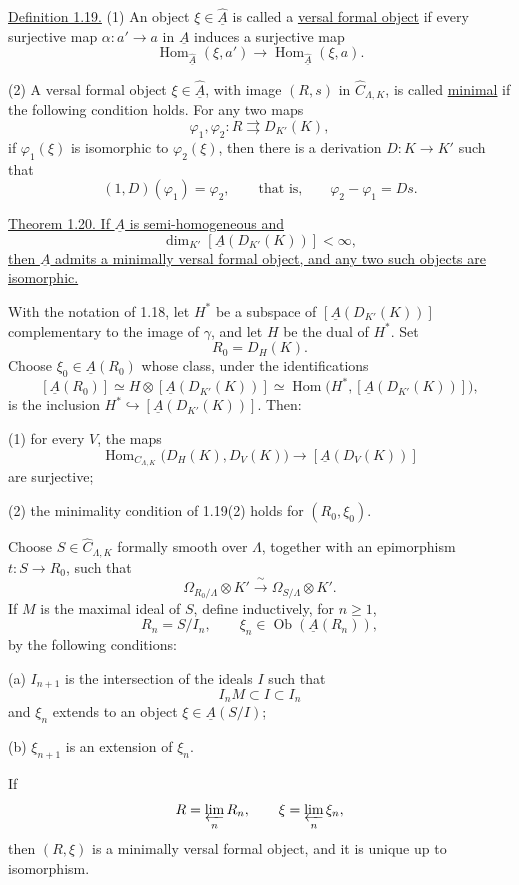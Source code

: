 
\underline{Definition 1.19.} (1) An object
$\xi\in\widehat{\underline A}$ is called a \underline{versal formal
object} if every surjective map $\alpha:a'\longrightarrow a$ in
$\underline A$ induces a surjective map
\[
 \operatorname{Hom}_{\widehat{\underline A}}(\xi,a')
 \longrightarrow
 \operatorname{Hom}_{\widehat{\underline A}}(\xi,a).
\]

(2) A versal formal object $\xi\in\widehat{\underline A}$, with
image $(R,s)$ in $\widehat C_{\Lambda,K}$, is called
\underline{minimal} if the following condition holds. For any two
maps
\[
 \varphi_1,\varphi_2:R\rightrightarrows D_{K'}(K),
\]
if $\varphi_1(\xi)$ is isomorphic to $\varphi_2(\xi)$, then there is
a derivation $D:K\longrightarrow K'$ such that
\[
 (1,D)(\varphi_1)=\varphi_2,
 \qquad\text{that is,}\qquad
 \varphi_2-\varphi_1=Ds.
\]

\underline{Theorem 1.20. If $\underline A$ is semi-homogeneous and}
\[
 \dim_{K'}[\underline A(D_{K'}(K))]<\infty,
\]
\underline{then $\underline A$ admits a minimally versal formal
object, and any two such objects are isomorphic.}


With the notation of 1.18, let $H^*$ be a subspace of
$[\underline A(D_{K'}(K))]$ complementary to the image of $\gamma$,
and let $H$ be the dual of $H^*$. Set
\[
 R_0=D_H(K).
\]
Choose $\xi_0\in\underline A(R_0)$ whose class, under the
identifications
\[
 [\underline A(R_0)]
 \simeq H\otimes[\underline A(D_{K'}(K))]
 \simeq
 \operatorname{Hom}\bigl(H^*,[\underline A(D_{K'}(K))]\bigr),
\]
is the inclusion
$H^*\hookrightarrow[\underline A(D_{K'}(K))]$. Then:

(1) for every $V$, the maps
\[
 \operatorname{Hom}_{C_{\Lambda,K}}
   \bigl(D_H(K),D_V(K)\bigr)
 \longrightarrow[\underline A(D_V(K))]
\]
are surjective;

(2) the minimality condition of 1.19(2) holds for
$(R_0,\xi_0)$.

Choose $S\in\widehat C_{\Lambda,K}$ formally smooth over $\Lambda$,
together with an epimorphism $t:S\longrightarrow R_0$, such that
\[
 \Omega_{R_0/\Lambda}\otimes K'
 \xrightarrow{\ \sim\ }
 \Omega_{S/\Lambda}\otimes K'.
\]
If $M$ is the maximal ideal of $S$, define inductively, for
$n\geq1$,
\[
 R_n=S/I_n,
 \qquad
 \xi_n\in\operatorname{Ob}(\underline A(R_n)),
\]
by the following conditions:

(a) $I_{n+1}$ is the intersection of the ideals $I$ such that
\[
 I_nM\subset I\subset I_n
\]
and $\xi_n$ extends to an object $\xi\in\underline A(S/I)$;

(b) $\xi_{n+1}$ is an extension of $\xi_n$.

If
\[
 R=\varprojlim_nR_n,
 \qquad
 \xi=\varprojlim_n\xi_n,
\]
then $(R,\xi)$ is a minimally versal formal object, and it is unique
up to isomorphism.

